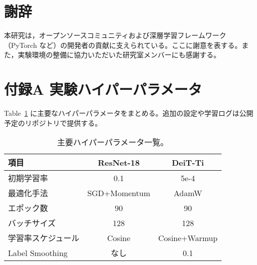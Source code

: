 \section*{謝辞}
本研究は，オープンソースコミュニティおよび深層学習フレームワーク（PyTorch など）の開発者の貢献に支えられている。ここに謝意を表する。また，実験環境の整備に協力いただいた研究室メンバーにも感謝する。

\section*{付録A 実験ハイパーパラメータ}
Table~\ref{tab:hyper} に主要なハイパーパラメータをまとめる。追加の設定や学習ログは公開予定のリポジトリで提供する。

\begin{table}[h]
  \centering
  \caption{主要ハイパーパラメータ一覧。}
  \label{tab:hyper}
  \begin{tabular}{lcc}
    \hline
    項目 & ResNet-18 & DeiT-Ti \\
    \hline
    初期学習率 & 0.1 & 5e-4 \\
    最適化手法 & SGD+Momentum & AdamW \\
    エポック数 & 90 & 90 \\
    バッチサイズ & 128 & 128 \\
    学習率スケジュール & Cosine & Cosine+Warmup \\
    Label Smoothing & なし & 0.1 \\
    \hline
  \end{tabular}
\end{table}
